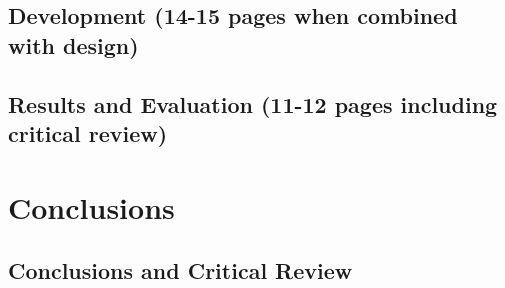 \documentclass[10pt]{article}
\begin{document}
\subsection {Development (14-15 pages when combined with design)}

\subsection {Results and Evaluation (11-12 pages including critical review)}

\section {Conclusions}

\subsection {Conclusions and Critical Review}

\printbibliography
\end{document}
